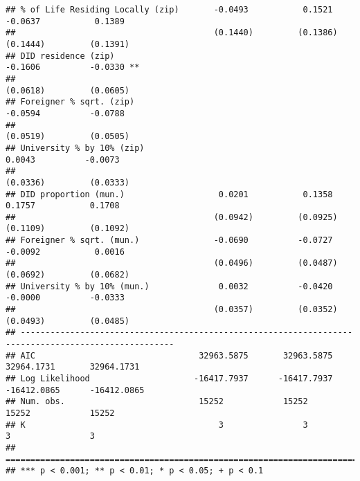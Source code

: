 \documentclass[
]{article}
\begin{document}
\begin{verbatim}
## % of Life Residing Locally (zip)       -0.0493           0.1521          -0.0637           0.1389    
##                                        (0.1440)         (0.1386)         (0.1444)         (0.1391)   
## DID residence (zip)                                                      -0.1606          -0.0330 ** 
##                                                                          (0.0618)         (0.0605)   
## Foreigner % sqrt. (zip)                                                  -0.0594          -0.0788    
##                                                                          (0.0519)         (0.0505)   
## University % by 10% (zip)                                                 0.0043          -0.0073    
##                                                                          (0.0336)         (0.0333)   
## DID proportion (mun.)                   0.0201           0.1358           0.1757           0.1708    
##                                        (0.0942)         (0.0925)         (0.1109)         (0.1092)   
## Foreigner % sqrt. (mun.)               -0.0690          -0.0727          -0.0092           0.0016    
##                                        (0.0496)         (0.0487)         (0.0692)         (0.0682)   
## University % by 10% (mun.)              0.0032          -0.0420          -0.0000          -0.0333    
##                                        (0.0357)         (0.0352)         (0.0493)         (0.0485)   
## -----------------------------------------------------------------------------------------------------
## AIC                                 32963.5875       32963.5875       32964.1731       32964.1731    
## Log Likelihood                     -16417.7937      -16417.7937      -16412.0865      -16412.0865    
## Num. obs.                           15252            15252            15252            15252         
## K                                       3                3                3                3         
## =====================================================================================================
## *** p < 0.001; ** p < 0.01; * p < 0.05; + p < 0.1
\end{verbatim}
\end{document}
